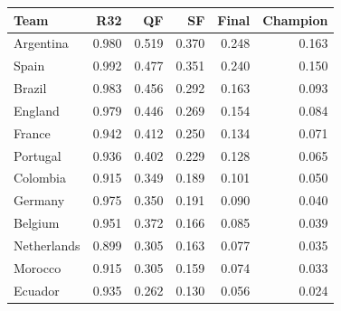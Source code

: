 \begin{tabular}{lrrrrr}
\toprule
Team & R32 & QF & SF & Final & Champion \\
\midrule
Argentina & 0.980 & 0.519 & 0.370 & 0.248 & 0.163 \\
Spain & 0.992 & 0.477 & 0.351 & 0.240 & 0.150 \\
Brazil & 0.983 & 0.456 & 0.292 & 0.163 & 0.093 \\
England & 0.979 & 0.446 & 0.269 & 0.154 & 0.084 \\
France & 0.942 & 0.412 & 0.250 & 0.134 & 0.071 \\
Portugal & 0.936 & 0.402 & 0.229 & 0.128 & 0.065 \\
Colombia & 0.915 & 0.349 & 0.189 & 0.101 & 0.050 \\
Germany & 0.975 & 0.350 & 0.191 & 0.090 & 0.040 \\
Belgium & 0.951 & 0.372 & 0.166 & 0.085 & 0.039 \\
Netherlands & 0.899 & 0.305 & 0.163 & 0.077 & 0.035 \\
Morocco & 0.915 & 0.305 & 0.159 & 0.074 & 0.033 \\
Ecuador & 0.935 & 0.262 & 0.130 & 0.056 & 0.024 \\
\bottomrule
\end{tabular}

